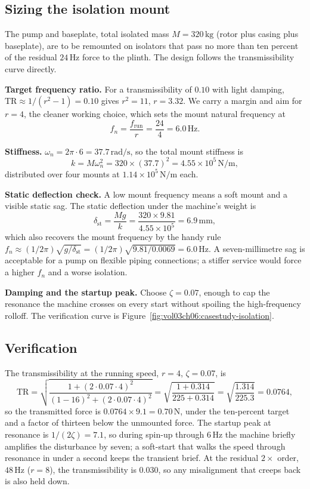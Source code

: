 \subsection{Sizing the isolation mount}

The pump and baseplate, total isolated mass $M = 320\,\si{\kilogram}$
(rotor plus casing plus baseplate), are to be remounted on isolators
that pass no more than ten percent of the residual $24\,\si{\hertz}$
force to the plinth. The design follows the transmissibility curve
directly.

\textbf{Target frequency ratio.} For a transmissibility of $0.10$ with
light damping, $\mathrm{TR}\approx 1/(r^2 - 1) = 0.10$ gives $r^2 = 11$,
$r = 3.32$. We carry a margin and aim for $r = 4$, the cleaner working
choice, which sets the mount natural frequency at
\[
f_n = \frac{f_{\text{run}}}{r} = \frac{24}{4} = 6.0\,\si{\hertz}.
\]

\textbf{Stiffness.} $\omega_n = 2\pi\cdot 6 = 37.7\,\si{\radian\per
\second}$, so the total mount stiffness is
\[
k = M\omega_n^2 = 320\times (37.7)^2 = 4.55\times 10^5\,\si{\newton\per
\meter},
\]
distributed over four mounts at $1.14\times 10^5\,\si{\newton\per
\meter}$ each.

\textbf{Static deflection check.} A low mount frequency means a soft
mount and a visible static sag. The static deflection under the
machine's weight is
\[
\delta_{\text{st}} = \frac{Mg}{k} = \frac{320\times 9.81}{4.55\times
10^5} = 6.9\,\si{\milli\meter},
\]
which also recovers the mount frequency by the handy rule $f_n \approx
(1/2\pi)\sqrt{g/\delta_{\text{st}}} = (1/2\pi)\sqrt{9.81/0.0069} =
6.0\,\si{\hertz}$. A seven-millimetre sag is acceptable for a pump on
flexible piping connections; a stiffer service would force a higher
$f_n$ and a worse isolation.

\textbf{Damping and the startup peak.} Choose $\zeta = 0.07$, enough to
cap the resonance the machine crosses on every start without spoiling
the high-frequency rolloff. The verification curve is
Figure~\ref{fig:vol03ch06:casestudy-isolation}.



\subsection{Verification}

The transmissibility at the running speed, $r = 4$, $\zeta = 0.07$, is
\[
\mathrm{TR} = \sqrt{\frac{1 + (2\cdot 0.07\cdot 4)^2}{(1 - 16)^2 +
(2\cdot 0.07\cdot 4)^2}} = \sqrt{\frac{1 + 0.314}{225 + 0.314}} =
\sqrt{\frac{1.314}{225.3}} = 0.0764,
\]
so the transmitted force is $0.0764\times 9.1 = 0.70\,\text{N}$, under
the ten-percent target and a factor of thirteen below the unmounted
force. The startup peak at resonance is $1/(2\zeta) = 7.1$, so during
spin-up through $6\,\si{\hertz}$ the machine briefly amplifies the
disturbance by seven; a soft-start that walks the speed through
resonance in under a second keeps the transient brief. At the residual
$2\times$ order, $48\,\si{\hertz}$ ($r = 8$), the transmissibility is
$0.030$, so any misalignment that creeps back is also held down.

